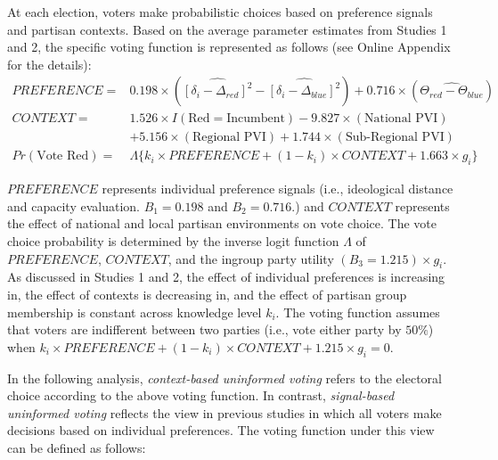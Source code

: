 \documentclass[letterpaper, 12pt]{article}
\begin{document}
    \par At each election, voters make probabilistic choices based on preference signals and partisan contexts. Based on the average parameter estimates from Studies 1 and 2, the specific voting function is represented as follows (see Online Appendix for the details): 
    \begin{align*}
        PREFERENCE = &0.198 \times (\widehat{[\delta_i-\Delta_{red}]^2} - \widehat{[\delta_i-\Delta_{blue}]^2}) + 0.716 \times (\widehat{\Theta_{red} - \Theta_{blue}}) \\
        CONTEXT = & 1.526 \times I(\mbox{Red$=$Incumbent}) - 9.827 \times (\mbox{National PVI}) \\
        & + 5.156 \times (\mbox{Regional PVI}) + 1.744 \times (\mbox{Sub-Regional PVI}) \\
        Pr(\mbox{Vote Red}) = &\Lambda\{ k_i \times PREFERENCE + (1-k_i) \times CONTEXT + 1.663 \times g_i \}
    \end{align*}
    
    \noindent $PREFERENCE$ represents individual preference signals (i.e., ideological distance and capacity evaluation. $B_1=0.198$ and $B_2=0.716$.) and $CONTEXT$ represents the effect of national and local partisan environments on vote choice. The vote choice probability is determined by the inverse logit function $\Lambda$ of $PREFERENCE$, $CONTEXT$, and the ingroup party utility $(B_3=1.215) \times g_i$. As discussed in Studies 1 and 2, the effect of individual preferences is increasing in, the effect of contexts is decreasing in, and the effect of partisan group membership is constant across knowledge level $k_i$. The voting function assumes that voters are indifferent between two parties (i.e., vote either party by $50\%$) when $k_i \times PREFERENCE + (1-k_i) \times CONTEXT + 1.215 \times g_i = 0$. 

    \par In the following analysis, \textit{context-based uninformed voting} refers to the electoral choice according to the above voting function. In contrast, \textit{signal-based uninformed voting} reflects the view in previous studies in which all voters make decisions based on individual preferences. The voting function under this view can be defined as follows:
\end{document}
